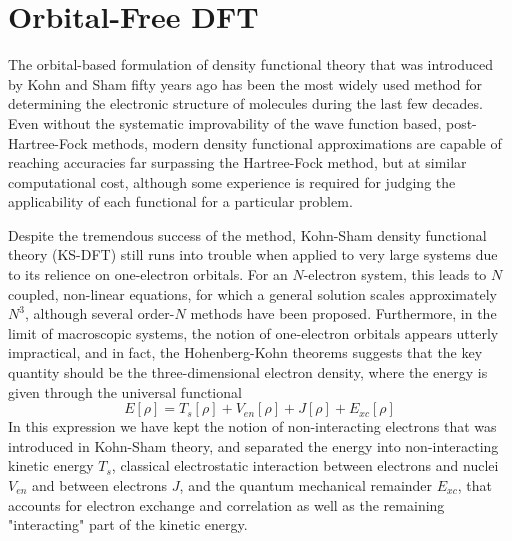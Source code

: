 \chapter{Orbital-Free DFT}\label{chap:of-dft}
The orbital-based formulation of density functional theory that was introduced by Kohn and Sham\cite{Kohn-Sham:1965} 
fifty years ago has been the most widely used method for determining the electronic structure 
of molecules during the last few decades. Even without the systematic improvability of the wave function based,
post-Hartree-Fock methods, modern density functional approximations are capable of reaching accuracies far
surpassing the Hartree-Fock method, but at similar computational cost, although some experience is required
for judging the applicability of each functional for a particular problem. 

Despite the tremendous success of the method, Kohn-Sham density functional theory (KS-DFT) still runs into 
trouble when applied to very large systems due to its relience on one-electron orbitals. For an $N$-electron
system, this leads to $N$ coupled, non-linear equations, for which a general solution scales approximately $N^3$,
although several order-$N$ methods have been proposed\cite{Goedecker:1999,Goedecker:2003,Watson:2004,Salek:2007}. 
Furthermore, in the limit of macroscopic 
systems, the notion of one-electron orbitals appears utterly impractical, and in fact, the 
Hohenberg-Kohn\cite{Hohenberg-Kohn:1964} theorems suggests that the key quantity should be the three-dimensional 
electron density, where the energy is given through the universal functional
\begin{equation}
    E[\rho] = T_s[\rho] + V_{en}[\rho] + J[\rho] + E_{xc}[\rho]
\end{equation}
In this expression we have kept the notion of non-interacting electrons that was introduced in Kohn-Sham theory,
and separated the energy into non-interacting kinetic energy $T_s$, classical electrostatic interaction between 
electrons and nuclei $V_{en}$ and between electrons $J$, and the quantum mechanical remainder $E_{xc}$, that 
accounts for electron exchange and correlation as well as the remaining "interacting" part of the kinetic energy.

